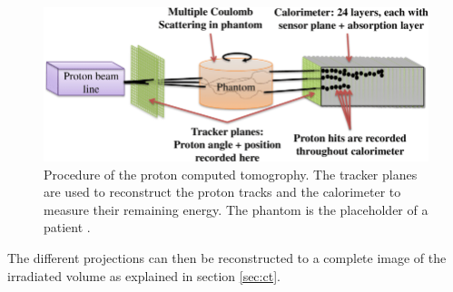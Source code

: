 \begin{figure}
  \centering
  \includegraphics[height=0.4\textwidth]{images/proton_ct.png}
  \caption{Procedure of the proton computed tomogrophy. The tracker planes are used to reconstruct the proton tracks and the calorimeter to measure their remaining energy.
  The phantom is the placeholder of a patient \cite{proton_ct}.}
  \label{fig:proton_ct}
\end{figure}

The different projections can then be reconstructed to a complete image of the irradiated volume as explained in section \ref{sec:ct}.
